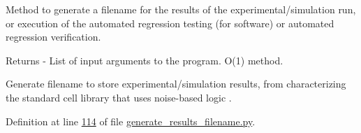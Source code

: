 Method to generate a filename for the results of the experimental/simulation run, or execution of the automated regression testing (for software) or automated regression verification. 

\begin{DoxyReturn}{Returns}
-\/ List of input arguments to the program. O(1) method. \begin{DoxyVerb}    Generate filename to store experimental/simulation
results, from characterizing the standard cell
library that uses noise-based logic
\cite{SaltyCrane2014}
\cite[datetime module, \S8.1.4 datetime Objects, now() function]{DrakeJr2016b}.
\end{DoxyVerb}
 
\end{DoxyReturn}


Definition at line \hyperlink{generate__results__filename_8py_source_l00114}{114} of file \hyperlink{generate__results__filename_8py_source}{generate\+\_\+results\+\_\+filename.\+py}.


